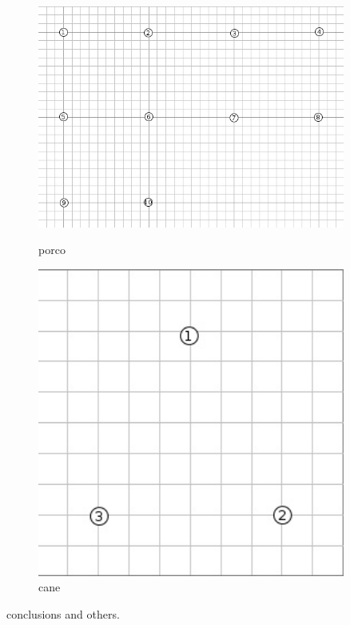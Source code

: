 \documentclass[11pt]{article}
\begin{document}
\begin{figure}[H]
  \centering
  \begin{minipage}{0.1\textwidth}
    \centering
    \includegraphics[width=0.9\textwidth]{Topology10-no-range}
    \caption{porco}
  \end{minipage}
  \begin{minipage}{0.1\textwidth}
    \centering
    \includegraphics[width=0.9\textwidth]{Topology3-no-range}
    \caption{cane}
  \end{minipage}
\end{figure}

conclusions and others.
\end{document}
